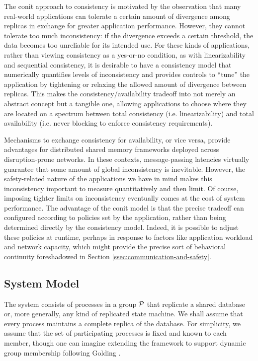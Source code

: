 \documentclass[]             %
{NASA}                       %
\theoremstyle{definition}
\begin{document}
The conit approach to consistency is motivated by the observation that
many real-world applications can tolerate a certain amount of
divergence among replicas in exchange for greater application
performance. However, they cannot tolerate too much inconsistency: if
the divergence exceeds a certain threshold, the data becomes too
unreliable for its intended use. For these kinds of applications,
rather than viewing consistency as a yes-or-no condition, as with
linearizability and sequential consistency, it is desirable to have a
consistency model that numerically quantifies levels of inconsistency
and provides controls to ``tune'' the application by tightening or
relaxing the allowed amount of divergence between replicas. This makes
the consistency/availability tradeoff into not merely an abstract
concept but a tangible one, allowing applications to choose where they
are located on a spectrum between total consistency
(i.e. linearizability) and total availability (i.e. never blocking to
enforce consistency requirements).

Mechanisms to exchange consistency for availability, or vice versa,
provide advantages for distributed shared memory frameworks deployed
across disruption-prone networks. In these contexts, message-passing
latencies virtually guarantee that some amount of global inconsistency
is inevitable. However, the safety-related nature of the applications
we have in mind makes this inconsistency important to measure
quantitatively and then limit. Of course, imposing tighter limits on
inconsistency eventually comes at the cost of system performance. The
advantage of the conit model is that the precise tradeoff can
configured according to policies set by the application, rather than
being determined directly by the consistency model. Indeed, it is
possible to adjust these policies at runtime, perhaps in response to
factors like application workload and network capacity, which might
provide the precise sort of behavioral continuity foreshadowed in
Section \ref{ssec:communication-and-safety}.


\subsection{System Model}
\label{ssec:conit-system-model}
The system consists of processes in a group $\mathcal{P}$ that replicate
a shared database or, more generally, any kind of replicated state
machine. We shall assume that every process maintains a complete
replica of the database. For simplicity, we assume that the set of
participating processes is fixed and known to each member, though one
can imagine extending the framework to support dynamic group
membership following Golding \cite{1992:golding-thesis}.
\end{document}
